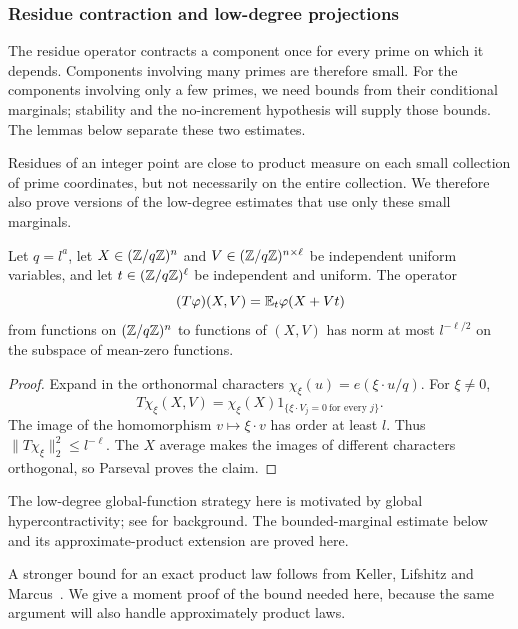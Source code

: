 \subsubsection{Residue contraction and low-degree projections}

The residue operator contracts a component once for every prime on
which it depends. Components involving many primes are therefore small.
For the components involving only a few primes, we need bounds from
their conditional marginals; stability and the no-increment hypothesis
will supply those bounds. The lemmas below separate these two estimates.

Residues of an integer point are close to product measure on each
small collection of prime coordinates, but not necessarily on the
entire collection. We therefore also prove versions of the low-degree
estimates that use only these small marginals.

\begin{lemma}\label{sampling:prime-contraction}
Let $q=l^a$, let $X\in(\mathbb Z/q\mathbb Z)^n$ and
$V\in(\mathbb Z/q\mathbb Z)^{n\times\ell}$ be independent uniform variables, and let
$t\in(\mathbb Z/q\mathbb Z)^\ell$ be independent and uniform.  The operator
\[
 (T\varphi)(X,V)=\mathbb E_t\varphi(X+Vt)
\]
from functions on $(\mathbb Z/q\mathbb Z)^n$ to functions of $(X,V)$ has norm at most
$l^{-\ell/2}$ on the subspace of mean-zero functions.
\end{lemma}
\begin{proof}
Expand in the orthonormal characters
$\chi_\xi(u)=e(\xi\cdot u/q)$.  For $\xi\ne0$,
\[
 T\chi_\xi(X,V)=\chi_\xi(X)
 1_{\{\xi\cdot V_j=0\ \text{for every }j\}}.
\]
The image of the homomorphism $v\mapsto\xi\cdot v$ has order at least
$l$.  Thus $\|T\chi_\xi\|_2^2\le l^{-\ell}$.
The $X$ average makes the images of different characters orthogonal, so
Parseval proves the claim.
\end{proof}

The low-degree global-function strategy here is motivated by global
hypercontractivity; see \cite{KeevashLifshitzLongMinzer2021} for background.
The bounded-marginal estimate below and its approximate-product extension
are proved here.

A stronger bound for an exact product law follows from
Keller, Lifshitz and Marcus~\cite[Theorem~5.4]{KellerLifshitzMarcus2026}.
We give a moment proof of the bound needed here, because the same
argument will also handle approximately product laws.


